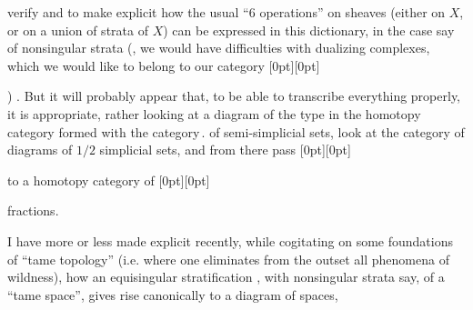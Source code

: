 %
verify and to make explicit how the usual ``6 operations'' on sheaves (either on $X$, or on a union of strata of $X$) can be expressed in this dictionary, in the case say of nonsingular strata (, we would have difficulties with dualizing complexes, which we would like to belong to our category%
\raisebox{0pt}[0pt][0pt]{\parbox{0pt}{}}%
) . But it will probably appear that, to be able to transcribe everything properly, it is appropriate, rather  looking at a diagram of the type
in the homotopy category formed with the category\,. of semi-simplicial sets,  look at the category of diagrams of $1/2$ simplicial sets, and from there pass%
\raisebox{0pt}[0pt][0pt]{\parbox{0pt}{}} to a homotopy category of %
\raisebox{0pt}[0pt][0pt]{\parbox{0pt}{}}fractions.

I have more or less made explicit recently, while cogitating on some foundations of ``tame topology'' (i.e. where one eliminates from the outset all phenomena of wildness), how an equisingular stratification%
, with nonsingular strata say, of a  ``tame space'', gives rise canonically to a diagram  of spaces,
